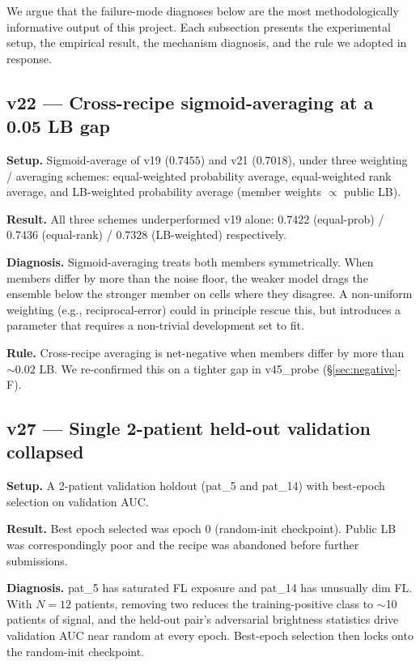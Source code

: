 \documentclass[conference]{IEEEtran}
\begin{document}
We argue that the failure-mode diagnoses below are the most methodologically informative output of this project. Each subsection presents the experimental setup, the empirical result, the mechanism diagnosis, and the rule we adopted in response.

\subsection{v22 --- Cross-recipe sigmoid-averaging at a 0.05 LB gap}

\textbf{Setup.} Sigmoid-average of v19 ($0.7455$) and v21 ($0.7018$), under three weighting / averaging schemes: equal-weighted probability average, equal-weighted rank average, and LB-weighted probability average (member weights $\propto$ public LB).

\textbf{Result.} All three schemes underperformed v19 alone: $0.7422$ (equal-prob) / $0.7436$ (equal-rank) / $0.7328$ (LB-weighted) respectively.

\textbf{Diagnosis.} Sigmoid-averaging treats both members symmetrically. When members differ by more than the noise floor, the weaker model drags the ensemble below the stronger member on cells where they disagree. A non-uniform weighting (e.g., reciprocal-error) could in principle rescue this, but introduces a parameter that requires a non-trivial development set to fit.

\textbf{Rule.} Cross-recipe averaging is net-negative when members differ by more than $\sim$$0.02$ LB. We re-confirmed this on a tighter gap in v45\_probe (\S\ref{sec:negative}-F).

\subsection{v27 --- Single 2-patient held-out validation collapsed}

\textbf{Setup.} A 2-patient validation holdout (pat\_5 and pat\_14) with best-epoch selection on validation AUC.

\textbf{Result.} Best epoch selected was epoch 0 (random-init checkpoint). Public LB was correspondingly poor and the recipe was abandoned before further submissions.

\textbf{Diagnosis.} pat\_5 has saturated FL exposure and pat\_14 has unusually dim FL. With $N=12$ patients, removing two reduces the training-positive class to $\sim$10 patients of signal, and the held-out pair's adversarial brightness statistics drive validation AUC near random at every epoch. Best-epoch selection then locks onto the random-init checkpoint.
\end{document}
